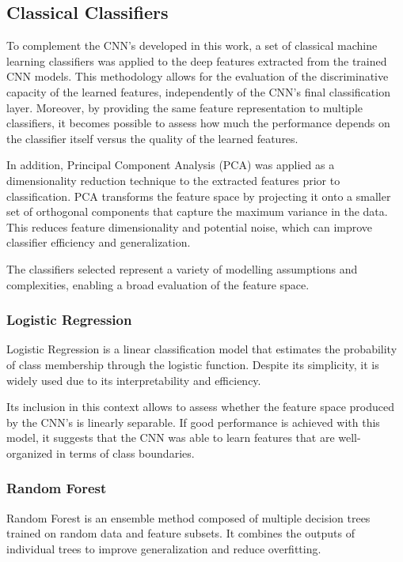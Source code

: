 \documentclass[journal,article,submit,pdftex,moreauthors]{Definitions/mdpi}
\begin{document}
\subsection{Classical Classifiers}
\label{sec:classical_classifiers}


To complement the CNN's developed in this work, a set of classical machine learning classifiers was applied to the deep features extracted from the trained CNN models. This methodology allows for the evaluation of the discriminative capacity of the learned features, independently of the CNN’s final classification layer. Moreover, by providing the same feature representation to multiple classifiers, it becomes possible to assess how much the performance depends on the classifier itself versus the quality of the learned features.

In addition, Principal Component Analysis (PCA) was applied as a dimensionality reduction technique to the extracted features prior to classification. PCA transforms the feature space by projecting it onto a smaller set of orthogonal components that capture the maximum variance in the data. This reduces feature dimensionality and potential noise, which can improve classifier efficiency and generalization.

The classifiers selected represent a variety of modelling assumptions and complexities, enabling a broad evaluation of the feature space.

\subsubsection*{Logistic Regression}

Logistic Regression is a linear classification model that estimates the probability of class membership through the logistic function. Despite its simplicity, it is widely used due to its interpretability and efficiency.

Its inclusion in this context allows to assess whether the feature space produced by the CNN's is linearly separable. If good performance is achieved with this model, it suggests that the CNN was able to learn features that are well-organized in terms of class boundaries.

\subsubsection*{Random Forest}

Random Forest is an ensemble method composed of multiple decision trees trained on random data and feature subsets. It combines the outputs of individual trees to improve generalization and reduce overfitting.
\end{document}
